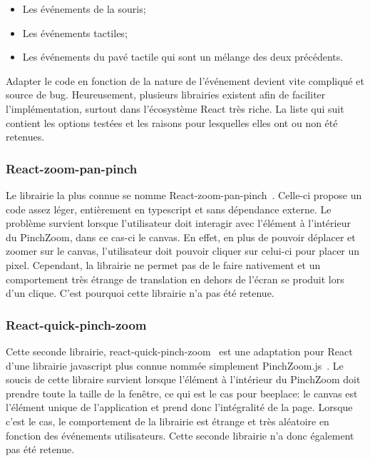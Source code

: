 \begin{itemize}
  \item Les événements de la souris;
  \item Les événements tactiles;
  \item Les événements du pavé tactile qui sont un mélange des deux précédents.
\end{itemize}

Adapter le code en fonction de la nature de l'événement devient vite compliqué et source de bug. Heureusement, plusieurs librairies existent afin de faciliter l'implémentation, surtout dans l'écosystème React très riche. La liste qui suit contient les options testées et les raisons pour lesquelles elles ont ou non été retenues.

\subsubsection{React-zoom-pan-pinch}

Le librairie la plus connue se nomme React-zoom-pan-pinch~\cite{react-zoom-pan-pinch}. Celle-ci propose un code assez léger, entièrement en \gls{typescript} et sans dépendance externe. Le problème survient lorsque l'utilisateur doit interagir avec l'élément à l'intérieur du PinchZoom, dans ce cas-ci le canvas. En effet, en plus de pouvoir déplacer et zoomer sur le canvas, l'utilisateur doit pouvoir cliquer sur celui-ci pour placer un pixel. Cependant, la librairie ne permet pas de le faire nativement et un comportement très étrange de translation en dehors de l'écran se produit lors d'un clique. C'est pourquoi cette librairie n'a pas été retenue.

\subsubsection{React-quick-pinch-zoom}

Cette seconde librairie, react-quick-pinch-zoom~\cite{react-quick-pinch-zoom} est une adaptation pour React d'une librairie \gls{javascript} plus connue nommée simplement PinchZoom.js~\cite{pinchzoomjs}. Le soucis de cette libraire survient lorsque l'élément à l'intérieur du PinchZoom doit prendre toute la taille de la fenêtre, ce qui est le cas pour \gls{beeplace}: le canvas est l'élément unique de l'application et prend donc l'intégralité de la page. Lorsque c'est le cas, le comportement de la librairie est étrange et très aléatoire en fonction des événements utilisateurs. Cette seconde librairie n'a donc également pas été retenue.

